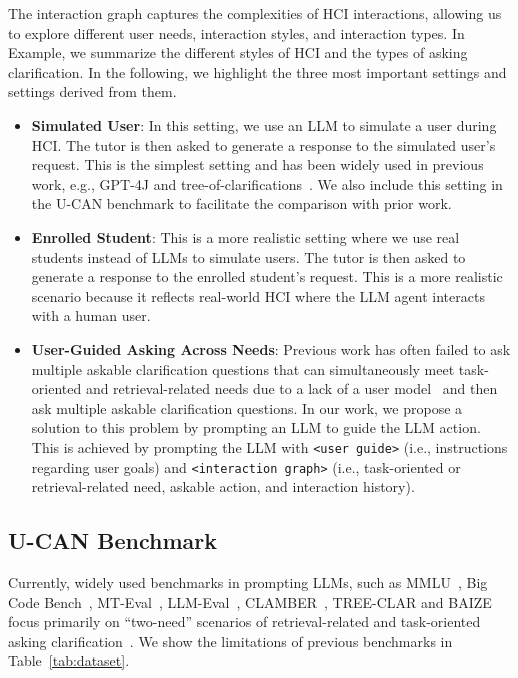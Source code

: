 \documentclass{article} %
\theoremstyle{definition}
\begin{document}
The interaction graph captures the complexities of HCI interactions, allowing us to explore different user needs, interaction styles, and interaction types.
In Example, we summarize the different styles of HCI and the types of asking clarification.
In the following, we highlight the three most important settings and settings derived from them.
\begin{itemize}[leftmargin=0.5cm,topsep=-0.8\parskip,noitemsep,nolistsep]
    \item \textbf{Simulated User}: In this setting, we use an LLM to simulate a user during HCI. The tutor is then asked to generate a response to the simulated user's request. This is the simplest setting and has been widely used in previous work, e.g., GPT-4J and tree-of-clarifications~\citep{tree_of_clarifications}. We also include this setting in the U-CAN benchmark to facilitate the comparison with prior work.
    \item \textbf{Enrolled Student}: This is a more realistic setting where we use real students instead of LLMs to simulate users. The tutor is then asked to generate a response to the enrolled student's request. This is a more realistic scenario because it reflects real-world HCI where the LLM agent interacts with a human user.
    \item \textbf{User-Guided Asking Across Needs}: Previous work has often failed to ask multiple askable clarification questions that can simultaneously meet task-oriented and retrieval-related needs due to a lack of a user model~\citep{clarinet,tree_of_clarifications,proactive_cot} and then ask multiple askable clarification questions.
    In our work, we propose a solution to this problem by prompting an LLM to guide the LLM action. This is achieved by prompting the LLM with \colorbox{commentcolor}{\texttt{<user guide>}} (i.e., instructions regarding user goals) and \colorbox{answercolor}{\texttt{<interaction graph>}} (i.e., task-oriented or retrieval-related need, askable action, and interaction history).
\end{itemize}

\subsection{U-CAN Benchmark}
\label{subsec:u_can}

Currently, widely used benchmarks in prompting LLMs, such as MMLU~\cite{math}, Big Code Bench~\cite{bigcodebench}, MT-Eval~\cite{mteval}, LLM-Eval~\cite{llm_as_judge}, CLAMBER~\citep{clamber}, TREE-CLAR and BAIZE~\citep{baize} focus primarily on ``two-need'' scenarios of retrieval-related and task-oriented asking clarification~\citep{clarinet,tree_of_clarifications,proactive_cot}.
We show the limitations of previous benchmarks in Table~\ref{tab:dataset}.
\end{document}
